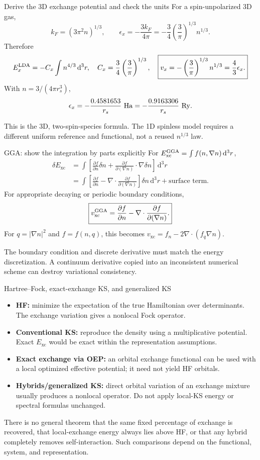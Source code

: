 \documentclass[aspectratio=169,10pt]{beamer}
\newcommand{\warnbox}[1]{\begin{tcolorbox}[colback=palewarm,colframe=warm,title={A trap to avoid}]#1\end{tcolorbox}}
\newcommand{\mbbox}[1]{\begin{tcolorbox}[colback=paleblue,colframe=uioblue,title={Many-body connection}]#1\end{tcolorbox}}
\newcommand{\dd}{\,\mathrm d}
\newcommand{\xc}{\mathrm{xc}}
\begin{document}
\begin{frame}{Derive the 3D exchange potential and check the units}
For a spin-unpolarized 3D gas,
\[
 k_F=(3\pi^2n)^{1/3},\qquad
 \epsilon_x=-\frac{3k_F}{4\pi}
            =-\frac34\left(\frac3\pi\right)^{1/3}n^{1/3}.
\]
Therefore
\[
 E_x^{\rm LDA}=-C_x\int n^{4/3}\dd^3r,\quad
 C_x=\frac34\left(\frac3\pi\right)^{1/3},\quad
 \boxed{v_x=-\left(\frac3\pi\right)^{1/3}n^{1/3}=\frac43\epsilon_x.}
\]
With $n=3/(4\pi r_s^3)$,
\[
 \epsilon_x=-\frac{0.4581653}{r_s}\ {\rm Ha}
           =-\frac{0.9163306}{r_s}\ {\rm Ry}.
\]
\warnbox{This is the 3D, two-spin-species formula. The 1D spinless model
requires a different uniform reference and functional, not a reused $n^{1/3}$ law.}
\end{frame}

\begin{frame}{GGA: show the integration by parts explicitly}
For $E_{\xc}^{\rm GGA}=\int f(n,\nabla n)\dd^3r$,
\begin{align*}
 \delta E_{\xc}
 &=\int\left[\frac{\partial f}{\partial n}\delta n
       +\frac{\partial f}{\partial(\nabla n)}\cdot\nabla\delta n\right]\dd^3r\\
 &=\int\left[\frac{\partial f}{\partial n}
       -\nabla\cdot\frac{\partial f}{\partial(\nabla n)}\right]\delta n\dd^3r
       +\text{surface term}.
\end{align*}
For appropriate decaying or periodic boundary conditions,
\[
 \boxed{v_{\xc}^{\rm GGA}=\frac{\partial f}{\partial n}
                       -\nabla\cdot\frac{\partial f}{\partial(\nabla n)}.}
\]
For $q=|\nabla n|^2$ and $f=f(n,q)$, this becomes
$v_{\xc}=f_n-2\nabla\cdot(f_q\nabla n)$.
\mbbox{The boundary condition and discrete derivative must match the energy
discretization. A continuum derivative copied into an inconsistent numerical
scheme can destroy variational consistency.}
\end{frame}

\begin{frame}{Hartree--Fock, exact-exchange KS, and generalized KS}
\begin{itemize}
\item \textbf{HF:} minimize the expectation of the true Hamiltonian over
determinants. The exchange variation gives a nonlocal Fock operator.
\item \textbf{Conventional KS:} reproduce the density using a multiplicative
potential. Exact $E_{\xc}$ would be exact within the representation assumptions.
\item \textbf{Exact exchange via OEP:} an orbital exchange functional can be
used with a local optimized effective potential; it need not yield HF orbitals.
\item \textbf{Hybrids/generalized KS:} direct orbital variation of an exchange
mixture usually produces a nonlocal operator. Do not apply local-KS energy
or spectral formulas unchanged.
\end{itemize}
\warnbox{There is no general theorem that the same fixed percentage of exchange
is recovered, that local-exchange energy always lies above HF, or that any
hybrid completely removes self-interaction. Such comparisons depend on the
functional, system, and representation.}
\end{frame}
\end{document}
